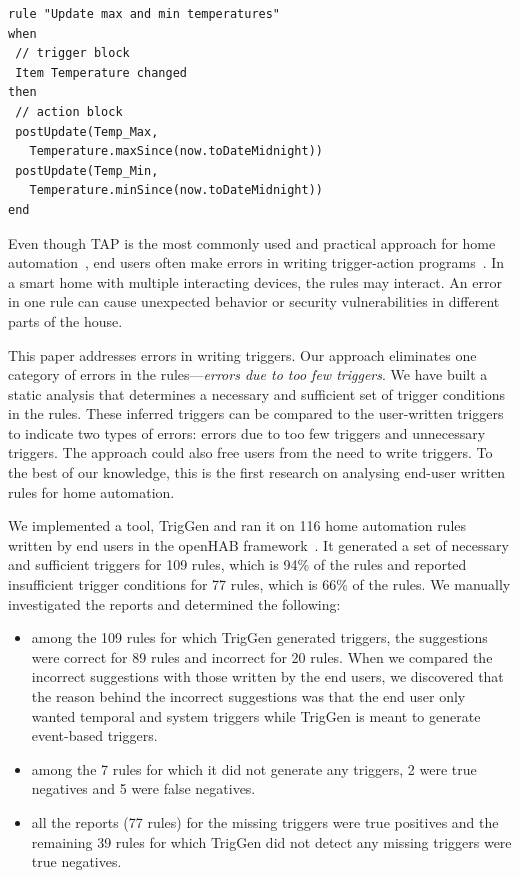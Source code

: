 \documentclass{sig-alternate-05-2015}
\begin{document}
\begin{lstlisting}[caption={A rule that updates the maximum and minimum temperature values for a day---it compares the current temperature with the values starting from midnight of the respective day. },label={lst:rule}]
rule "Update max and min temperatures"
when
 // trigger block	
 Item Temperature changed
then	
 // action block 
 postUpdate(Temp_Max, 
   Temperature.maxSince(now.toDateMidnight))
 postUpdate(Temp_Min, 
   Temperature.minSince(now.toDateMidnight))
end
\end{lstlisting}

Even though TAP is the most commonly used and practical approach for home
automation~\cite{practical-tap, dey}, end users often make errors in writing
trigger-action programs~\cite{Huang,wild-tap}.  In a smart home with
multiple interacting devices, the rules may interact.  An error in one rule
can cause unexpected behavior or security vulnerabilities in different
parts of the house.

This paper addresses errors in writing triggers.  Our approach eliminates
one category of errors in the rules---\textit{errors due to too few triggers}. We have built a static analysis that determines 
a necessary and sufficient set
of trigger conditions in the rules.  These inferred triggers can be
compared to the user-written triggers to indicate two types of errors:
errors due to too few triggers and unnecessary triggers.  The approach
could also free users from the need to write triggers. 
To the best of our knowledge, this is the first research on analysing
end-user written rules for home automation.

We implemented a tool, TrigGen and ran it on 116 home automation rules 
written by end users in the openHAB framework~\cite{openhab}.  It generated a set of necessary and sufficient triggers for 109 rules, which is 94\% of the rules and reported
insufficient trigger conditions for 77 rules, which is 66\%
of the rules.  We manually investigated the reports and determined the following:
\begin{itemize} [topsep=3pt,itemsep=-1ex,partopsep=1ex,parsep=1ex]
\item among the 109 rules for which TrigGen generated triggers, the suggestions were correct for 89 rules and incorrect for 20 rules. When we compared the incorrect suggestions with those written by the end users, we discovered that the reason behind the incorrect suggestions was that the end user only wanted temporal and system triggers while TrigGen is meant to generate event-based triggers.
\item among the 7 rules for which it did not generate any triggers, 2 were true negatives and 5 were false negatives. 
\item all the reports (77 rules) for the missing triggers were true positives and the remaining 39 rules for which TrigGen did not detect any missing triggers were true negatives.
\end{itemize}
\end{document}
